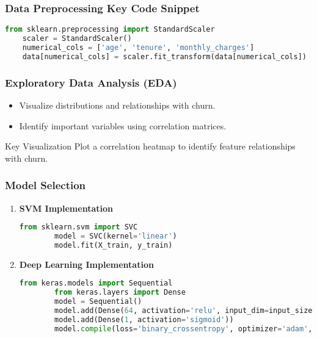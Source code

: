 \documentclass[aspectratio=169]{beamer}
\begin{document}
\begin{frame}[fragile]
    \frametitle{Data Preprocessing Key Code Snippet}
    \begin{lstlisting}[language=Python]
    from sklearn.preprocessing import StandardScaler
    scaler = StandardScaler()
    numerical_cols = ['age', 'tenure', 'monthly_charges']
    data[numerical_cols] = scaler.fit_transform(data[numerical_cols])
    \end{lstlisting}
\end{frame}

\begin{frame}[fragile]
    \frametitle{Exploratory Data Analysis (EDA)}
    \begin{itemize}
        \item Visualize distributions and relationships with churn.
        \item Identify important variables using correlation matrices.
    \end{itemize}
    
    \begin{block}{Key Visualization}
        Plot a correlation heatmap to identify feature relationships with churn.
    \end{block}
\end{frame}

\begin{frame}[fragile]
    \frametitle{Model Selection}
    \begin{enumerate}
        \item \textbf{SVM Implementation}
        \begin{lstlisting}[language=Python]
        from sklearn.svm import SVC
        model = SVC(kernel='linear')
        model.fit(X_train, y_train)
        \end{lstlisting}
        \item \textbf{Deep Learning Implementation}
        \begin{lstlisting}[language=Python]
        from keras.models import Sequential
        from keras.layers import Dense
        model = Sequential()
        model.add(Dense(64, activation='relu', input_dim=input_size))
        model.add(Dense(1, activation='sigmoid'))
        model.compile(loss='binary_crossentropy', optimizer='adam', metrics=['accuracy'])
        \end{lstlisting}
    \end{enumerate}
\end{frame}
\end{document}
